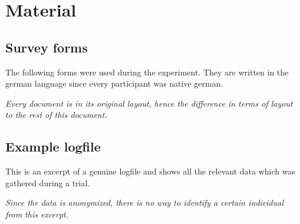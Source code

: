     \appendix

        \chapter{Material}

            \section{Survey forms}\label{surveys}

                The following forms were used during the experiment. They are written in the german language since every participant was native german. 

                \medskip

                \textit{Every document is in its original layout, hence the difference in terms of layout to the rest of this document.}


                \label{consent}
                \label{q-prior}
                \label{q-post}

            \section{Example logfile}\label{logfile}                

                This is an excerpt of a genuine logfile and shows all the relevant data which was gathered during a trial. 
                
                \medskip

                \textit{Since the data is anonymized, there is no way to identify a certain individual from this excerpt.}

